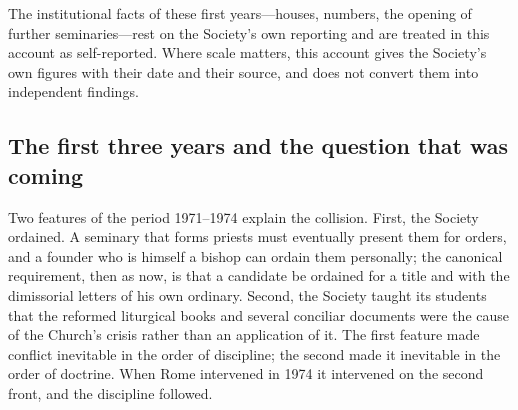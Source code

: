 The institutional facts of these first years---houses, numbers, the
opening of further seminaries---rest on the Society's own reporting and
are treated in this account as self-reported. Where scale matters, this
account gives the Society's own figures with their date and their source,
and does not convert them into independent findings.

\subsection{The first three years and the question that was coming}

Two features of the period 1971--1974 explain the collision. First, the
Society ordained. A seminary that forms priests must eventually present
them for orders, and a founder who is himself a bishop can ordain them
personally; the canonical requirement, then as now, is that a candidate
be ordained for a title and with the dimissorial letters of his own
ordinary. Second, the Society taught its students that the reformed
liturgical books and several conciliar documents were the cause of the
Church's crisis rather than an application of it. The first feature made
conflict inevitable in the order of discipline; the second made it
inevitable in the order of doctrine. When Rome intervened in 1974 it
intervened on the second front, and the discipline followed.

\begin{documentinventory}
\end{documentinventory}
